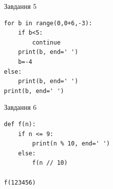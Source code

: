 \documentclass[12pt, ukrainian]{article}
\begin{document}
{\vspace{15mm}
\begin{minipage}[t]{9.7cm}                
{\begin{center}Завдання {5}\end{center}}
\begin{verbatim}
for b in range(0,0+6,-3):
    if b<5:
        continue
    print(b, end=' ')
    b=-4
else:
    print(b, end=' ')
print(b, end=' ')
\end{verbatim}     
\end{minipage}
\vline \hspace{8mm}
\begin{minipage}[t]{8.0cm}                
{\begin{center}Завдання {6}\end{center}}
\begin{verbatim}
def f(n):
    if n <= 9:
        print(n % 10, end=' ')
    else:
        f(n // 10)

f(123456)
\end{verbatim}     
\end{minipage}

}
\newpage
\end{document}

